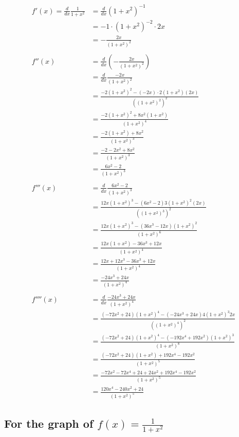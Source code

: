 \documentclass[9pt]{article}
\begin{document}
\begin{align*}
  f'(x) = \frac{d}{dx} \frac{1}{1 + x^2} &= \frac{d}{dx}(1 + x^2)^{-1} \\
                                         &= -1 \cdot (1 + x^2)^{-2} \cdot 2x \\
                                         &= -\frac{2x}{(1 + x^2)^2} \\
\\
f''(x) &= \frac{d}{dx} (-\frac{2x}{(1 + x^2)^2}) \\
       &= \frac{d}{dx} \frac{-2x}{(1 + x^2)^2} \\
       &= \frac{-2(1 + x^2)^2 - (-2x)\cdot 2(1 + x^2)(2x)}{((1 + x^2)^2)^2} \\
       &= \frac{-2(1 + x^2)^2 + 8x^2 (1 + x^2)}{(1 + x^2)^4} \\
       &= \frac{-2(1 + x^2) + 8x^2}{(1 + x^2)^3} \\
       &= \frac{-2 - 2x^2 + 8x^2}{(1 + x^2)^3} \\
       &= \frac{6x^2 - 2}{(1 + x^2)^3} \\
\\
f'''(x) &= \frac{d}{dx} \frac{6x^2 - 2}{(1 + x^2)^3} \\
        &= \frac{12x (1 + x^2)^3 - (6x^2 - 2)3(1 + x^2)^2 (2x)}{((1 + x^2)^3)^2} \\
        &= \frac{12x (1 + x^2)^3 - (36x^3 - 12x)(1 + x^2)^2}{(1 + x^2)^6} \\
        &= \frac{12x (1 + x^2) - 36x^3 + 12x}{(1 + x^2)^4} \\
        &= \frac{12x + 12x^3 - 36x^3 + 12x}{(1 + x^2)^4} \\
        &= \frac{-24x^3 + 24x}{(1 + x^2)^4} \\
\\
f''''(x) &= \frac{d}{dx} \frac{-24x^3 + 24x}{(1 + x^2)^4} \\
         &= \frac{(-72x^2 + 24) (1 + x^2)^4 - (-24x^3 + 24x)4(1 + x^2)^3 2x}{((1 + x^2)^4)^2} \\
         &= \frac{(-72x^2 + 24) (1 + x^2)^4 - (-192x^4 + 192x^2)(1 + x^2)^3}{(1 + x^2)^8} \\
         &= \frac{(-72x^2 + 24) (1 + x^2) + 192x^4 - 192x^2}{(1 + x^2)^5} \\
         &= \frac{-72x^2 - 72x^4 + 24 + 24x^2 + 192x^4 - 192x^2}{(1 + x^2)^5} \\
         &= \frac{120x^4 - 240x^2 + 24}{(1 + x^2)^5}
\end{align*}

\subsection*{For the graph of $f(x) = \frac{1}{1 + x^2}$}
\end{document}
